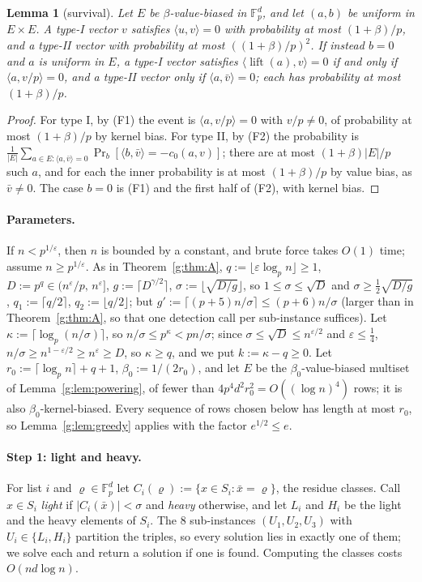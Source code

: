 \documentclass[11pt]{article}
\newtheorem{lemma}[theorem]{Lemma}
\theoremstyle{definition}
\theoremstyle{remark}
\newcommand{\Fp}{\mathbb{F}_p}
\newcommand{\eps}{\varepsilon}
\DeclareMathOperator{\lift}{lift}
\begin{document}
\begin{lemma}[survival]\label{g:lem:survival}
Let $E$ be $\beta$-value-biased in $\Fp^d$, and let $(a,b)$ be uniform in $E\times E$. A type-I vector $v$ satisfies $\langle u,v\rangle=0$ with probability at most $(1+\beta)/p$, and a type-II vector with probability at most $((1+\beta)/p)^2$. If instead $b=0$ and $a$ is uniform in $E$, a type-I vector satisfies $\langle\lift(a),v\rangle=0$ if and only if $\langle a,v/p\rangle=0$, and a type-II vector only if $\langle a,\bar v\rangle=0$; each has probability at most $(1+\beta)/p$.
\end{lemma}
\begin{proof}
For type I, by (F1) the event is $\langle a,v/p\rangle=0$ with $v/p\ne0$, of probability at most $(1+\beta)/p$ by kernel bias. For type II, by (F2) the probability is $\frac1{|E|}\sum_{a\in E:\langle a,\bar v\rangle=0}\Pr_b[\langle b,\bar v\rangle=-c_0(a,v)]$; there are at most $(1+\beta)|E|/p$ such $a$, and for each the inner probability is at most $(1+\beta)/p$ by value bias, as $\bar v\ne0$. The case $b=0$ is (F1) and the first half of (F2), with kernel bias.
\end{proof}

\paragraph{Parameters.} If $n<p^{1/\eps}$, then $n$ is bounded by a constant, and brute force takes $O(1)$ time; assume $n\ge p^{1/\eps}$. As in Theorem~\ref{g:thm:A}, $q:=\lfloor\eps\log_pn\rfloor\ge1$, $D:=p^q\in(n^\eps/p,\,n^\eps]$, $g:=\lceil D^{\gamma/2}\rceil$, $\sigma:=\lfloor\sqrt{D/g}\rfloor$, so $1\le\sigma\le\sqrt D$ and $\sigma\ge\frac12\sqrt{D/g}$, $q_1:=\lceil q/2\rceil$, $q_2:=\lfloor q/2\rfloor$; but $g':=\lceil(p+5)n/\sigma\rceil\le(p+6)n/\sigma$ (larger than in Theorem~\ref{g:thm:A}, so that one detection call per sub-instance suffices). Let $\kappa:=\lceil\log_p(n/\sigma)\rceil$, so $n/\sigma\le p^\kappa<pn/\sigma$; since $\sigma\le\sqrt D\le n^{\eps/2}$ and $\eps\le\frac14$, $n/\sigma\ge n^{1-\eps/2}\ge n^\eps\ge D$, so $\kappa\ge q$, and we put $k:=\kappa-q\ge0$. Let $r_0:=\lceil\log_pn\rceil+q+1$, $\beta_0:=1/(2r_0)$, and let $E$ be the $\beta_0$-value-biased multiset of Lemma~\ref{g:lem:powering}, of fewer than $4p^4d^2r_0^2=O((\log n)^4)$ rows; it is also $\beta_0$-kernel-biased. Every sequence of rows chosen below has length at most $r_0$, so Lemma~\ref{g:lem:greedy} applies with the factor $e^{1/2}\le e$.

\paragraph{Step 1: light and heavy.} For list $i$ and $\varrho\in\Fp^d$ let $C_i(\varrho):=\{x\in S_i:\bar x=\varrho\}$, the residue classes. Call $x\in S_i$ \emph{light} if $|C_i(\bar x)|<\sigma$ and \emph{heavy} otherwise, and let $L_i$ and $H_i$ be the light and the heavy elements of $S_i$. The $8$ sub-instances $(U_1,U_2,U_3)$ with $U_i\in\{L_i,H_i\}$ partition the triples, so every solution lies in exactly one of them; we solve each and return a solution if one is found. Computing the classes costs $O(nd\log n)$.
\end{document}
